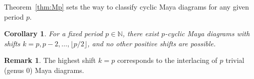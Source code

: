 \documentclass[10pt]{amsart}
\newtheorem{cor}[thm]{Corollary}
\newtheorem{prop}[thm]{Proposition}
\theoremstyle{definition}
\newtheorem{remark}[thm]{Remark}
\numberwithin{equation}{section}
\numberwithin{figure}{section}
\newcommand{\N}{\mathbb{N}}
\newcommand{\Z}{\mathbb{Z}}
\newcommand{\bmu}{{\boldsymbol{\mu}}}
\renewcommand{\H}{H}%
\newcommand{\cL}{L}%
\begin{document}
Theorem~\ref{thm:Mp} sets the way to classify cyclic Maya diagrams for
any given period $p$.
\begin{cor}\label{cor:k}
  For a fixed period $p\in \N$, there exist $p$-cyclic Maya diagrams with
  shifts $k=p,p-2,\dots,\lfloor p/2\rfloor$, and no other positive shifts are  possible.
\end{cor}

\begin{remark}
  The highest shift $k=p$ corresponds to the interlacing of $p$ trivial (genus
  0) Maya diagrams.
\end{remark}




\end{document}
